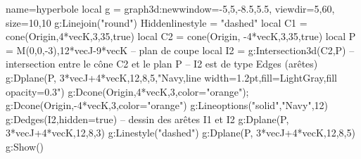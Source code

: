 \begin{luadraw}{name=hyperbole}
local g = graph3d:new{window={-5,5,-8.5,5.5}, viewdir={5,60}, size={10,10}}
g:Linejoin("round")
Hiddenlinestyle = "dashed"
local C1 = cone(Origin,4*vecK,3,35,true)
local C2 = cone(Origin, -4*vecK,3,35,true)
local P = {M(0,0,-3),12*vecJ-9*vecK} -- plan de coupe
local I2 = g:Intersection3d(C2,P) -- intersection entre le cône C2 et le plan P
-- I2 est de type Edges (arêtes)
g:Dplane(P, 3*vecJ+4*vecK,12,8,5,"Navy,line width=1.2pt,fill=LightGray,fill opacity=0.3")
g:Dcone(Origin,4*vecK,3,{color="orange"}); g:Dcone(Origin,-4*vecK,3,{color="orange"})
g:Lineoptions("solid","Navy",12)
g:Dedges(I2,{hidden=true}) -- dessin des arêtes I1 et I2
g:Dplane(P, 3*vecJ+4*vecK,12,8,3)
g:Linestyle("dashed")
g:Dplane(P, 3*vecJ+4*vecK,12,8,5)
g:Show()
\end{luadraw}
